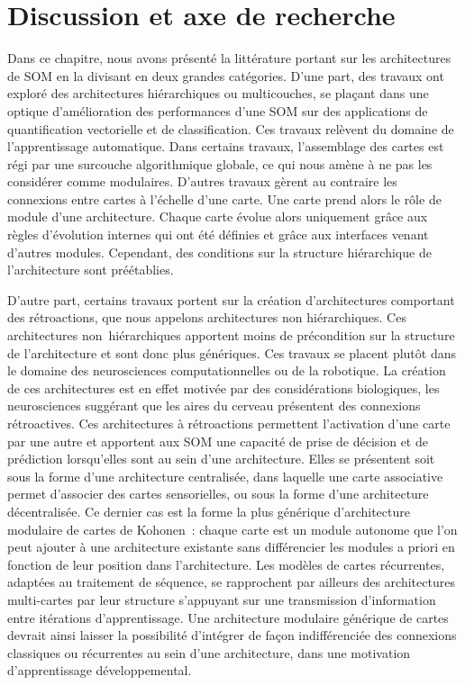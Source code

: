 \documentclass[../main]{subfiles}
\begin{document}
\section{Discussion et axe de recherche}

Dans ce chapitre, nous avons présenté la littérature portant sur les architectures de SOM en la divisant en deux grandes catégories. 
D'une part, des travaux ont exploré des architectures hiérarchiques ou multicouches, se plaçant dans une optique d'amélioration des performances d'une SOM sur des applications de quantification vectorielle et de classification. Ces travaux relèvent du domaine de l'apprentissage automatique. 
Dans certains travaux, l'assemblage des cartes est régi par une surcouche algorithmique globale, ce qui nous amène à ne pas les considérer comme modulaires. 
D'autres travaux gèrent au contraire les connexions entre cartes à l'échelle d'une carte. Une carte prend alors le rôle de module d'une architecture. Chaque carte évolue alors uniquement grâce aux règles d'évolution internes qui ont été définies et grâce aux interfaces venant d'autres modules. Cependant, des conditions sur la structure hiérarchique de l'architecture sont préétablies.

D'autre part, certains travaux portent sur la création d'architectures comportant des rétroactions, que nous appelons architectures non hiérarchiques. Ces architectures non~hiérarchiques apportent moins de précondition sur la structure de l'architecture et sont donc plus génériques.
Ces travaux se placent plutôt dans le domaine des neurosciences computationnelles ou de la robotique. La création de ces architectures est en effet motivée par des considérations biologiques, les neurosciences suggérant que les aires du cerveau présentent des connexions rétroactives. 
Ces architectures à rétroactions permettent l'activation d'une carte par une autre et apportent aux SOM une capacité de prise de décision et de prédiction lorsqu'elles sont au sein d'une architecture. 
Elles se présentent soit sous la forme d'une architecture centralisée, dans laquelle une carte associative permet d'associer des cartes sensorielles, ou sous la forme d'une architecture décentralisée. 
Ce dernier cas est la forme la plus générique d'architecture modulaire de cartes de Kohonen~: chaque carte est un module autonome que l'on peut ajouter à une architecture existante sans différencier les modules a priori en fonction de leur position dans l'architecture.
Les modèles de cartes récurrentes, adaptées au traitement de séquence, se rapprochent par ailleurs des architectures multi-cartes par leur structure s'appuyant sur une transmission d'information entre itérations d'apprentissage.
Une architecture modulaire générique de cartes devrait ainsi laisser la possibilité d'intégrer de façon indifférenciée des connexions classiques ou récurrentes au sein d'une architecture, dans une motivation d'apprentissage développemental.
\end{document}
